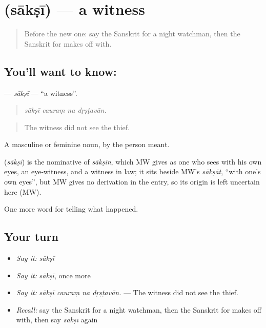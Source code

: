 \section[\texorpdfstring{\sk{साक्षी} (sākṣī)}{साक्षी (sākṣī)}]{ (sākṣī) — a witness}

\label{lesson:SA-C286-saksi}



\begin{quote}
Before the new one: say the Sanskrit for a night watchman, then the Sanskrit for makes off with.
\end{quote}

\subsection*{You'll want to know: }
\textbf{} — \emph{sākṣī} — \textquotedblleft{}a witness\textquotedblright{}.

\begin{quote}
   
\end{quote}

\begin{quote}
\emph{sākṣī cauraṃ na dṛṣṭavān.}
\end{quote}

\begin{quote}
The witness did not see the thief.
\end{quote}

A masculine or feminine noun, by the person meant.

\begin{cousinweb}
\textbf{} (\emph{sākṣī}) is the nominative of \emph{sākṣin}, which MW gives as one who sees with his own eyes, an eye-witness, and a witness in law; it sits beside MW's \emph{sākṣāt}, \textquotedblleft{}with one's own eyes\textquotedblright{}, but MW gives no derivation in the entry, so its origin is left uncertain here (MW).
\end{cousinweb}

\begin{grammarlens}[title={What you've built}]
One more word for telling what happened.
\end{grammarlens}

\subsection*{Your turn}
\begin{itemize}
\raggedright
  \item \emph{Say it:} \emph{sākṣī}
  \item \emph{Say it:} \emph{sākṣī}, once more
  \item \emph{Say it:} \emph{sākṣī cauraṃ na dṛṣṭavān.} — The witness did not see the thief.
  \item \emph{Recall:} say the Sanskrit for a night watchman, then the Sanskrit for makes off with, then say \emph{sākṣī} again
\end{itemize}

